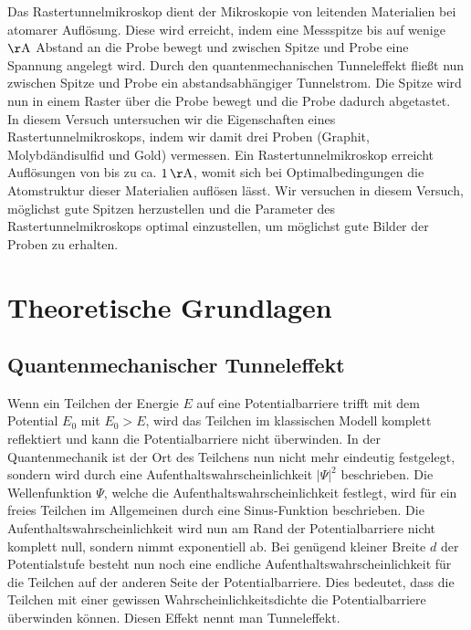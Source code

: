 \documentclass[12pt]{article}
\begin{document}
Das Rastertunnelmikroskop dient der Mikroskopie von leitenden Materialien bei atomarer Auflösung. Diese wird erreicht, indem eine Messspitze bis auf wenige $\mathrm{\AA}$ Abstand an die Probe bewegt und zwischen Spitze und Probe eine Spannung angelegt wird. Durch den quantenmechanischen Tunneleffekt fließt nun zwischen Spitze und Probe ein abstandsabhängiger Tunnelstrom. Die Spitze wird nun in einem Raster über die Probe bewegt und die Probe dadurch abgetastet.\\

In diesem Versuch untersuchen wir die Eigenschaften eines Rastertunnelmikroskops, indem wir damit drei Proben (Graphit, Molybdändisulfid und Gold) vermessen. Ein Rastertunnelmikroskop erreicht Auflösungen von bis zu ca. $1\,\mathrm{\AA}$, womit sich bei Optimalbedingungen die Atomstruktur dieser Materialien auflösen lässt. Wir versuchen in diesem Versuch, möglichst gute Spitzen herzustellen und die Parameter des Rastertunnelmikroskops optimal einzustellen, um möglichst gute Bilder der Proben zu erhalten.



\newpage
\section{Theoretische Grundlagen}


\subsection{Quantenmechanischer Tunneleffekt}\label{tunnel}

Wenn ein Teilchen der Energie $E$ auf eine Potentialbarriere trifft mit dem Potential $E_0$ mit $E_0>E$, wird das Teilchen im klassischen Modell komplett reflektiert und kann die Potentialbarriere nicht überwinden. In der Quantenmechanik ist der Ort des Teilchens nun nicht mehr eindeutig festgelegt, sondern wird durch eine Aufenthaltswahrscheinlichkeit $|\Psi|^2$ beschrieben. Die Wellenfunktion $\Psi$, welche die Aufenthaltswahrscheinlichkeit festlegt, wird für ein freies Teilchen im Allgemeinen durch eine Sinus-Funktion beschrieben. Die Aufenthaltswahrscheinlichkeit wird nun am Rand der Potentialbarriere nicht komplett null, sondern nimmt exponentiell ab. Bei genügend kleiner Breite $d$ der Potentialstufe besteht nun noch eine endliche Aufenthaltswahrscheinlichkeit für die Teilchen auf der anderen Seite der Potentialbarriere. Dies bedeutet, dass die Teilchen mit einer gewissen Wahrscheinlichkeitsdichte die Potentialbarriere überwinden können. Diesen Effekt nennt man Tunneleffekt.
\end{document}
